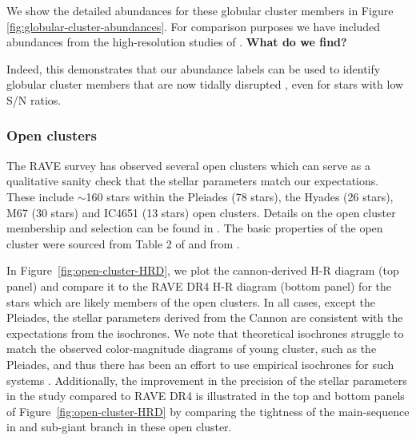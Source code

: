\documentclass[preprint,trackchanges]{aastex}
\newcommand{\stub}[1]{{\color{blue} \textbf{#1}}}
\begin{document}
We show the detailed abundances for these globular cluster members in
Figure \ref{fig:globular-cluster-abundances}.  For comparison purposes we
have included abundances from the high-resolution studies of \citep{people}.
\stub{What do we find?}

Indeed, this demonstrates that our abundance labels can be used to identify
globular cluster members that are now tidally disrupted \citep{Anguiano_2016,Kuzma_2016,Navin_2016},
even for stars with low S/N ratios.






\subsubsection{Open clusters}
\label{sec:open-cluster-validation}
The RAVE survey has observed several open clusters which can serve as a qualitative sanity check that the stellar parameters match our expectations. These include $\sim$160 stars within the Pleiades (78 stars), the Hyades (26 stars), M67 (30 stars) and IC4651 (13 stars) open clusters. Details on the open cluster membership and selection can be found in \cite{Kunder_2016}. The basic properties of the open cluster were sourced from Table 2 of \cite{Kunder_2016} and from \cite{Kharchenko_2013}. 

In Figure~\ref{fig:open-cluster-HRD}, we plot the cannon-derived H-R diagram (top panel) and compare it to the RAVE DR4 H-R diagram (bottom panel) for the stars which are likely members of the open clusters. In all cases, except the Pleiades, the stellar parameters derived from the Cannon are consistent with the expectations from the isochrones. We note that theoretical isochrones struggle to match the observed color-magnitude diagrams of young cluster, such as the Pleiades, and thus there has been an effort to use empirical isochrones for such systems \citep[e.g.][]{Bouy_2015}. Additionally, the improvement in the precision of the stellar parameters in the study compared to RAVE DR4 is illustrated in the top and bottom panels of Figure~\ref{fig:open-cluster-HRD} by comparing the tightness of the main-sequence in and sub-giant branch in these open cluster.
\end{document}
